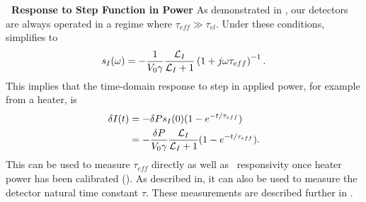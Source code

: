 \textbf{\TES\ Response to Step Function in Power}
As demonstrated in , our detectors are always operated in a regime where $\tau_{eff} \gg \tau_{el}$.
Under these conditions,  simplifies to
\begin{equation} \label{eqn:htr-step-resp-high}
s_I(\omega) = - \frac{1}{V_0 \gamma}\frac{\mathcal{L}_I}{\mathcal{L}_I + 1}
                       \left(1 + j \omega \tau_{eff}\right)^{-1}.
\end{equation}
This implies that the time-domain response to step in applied power, for example from a heater, is
\begin{align} \label{eqn:htr-step-resp-high-time}
    \delta I(t) & = - \delta P s_I(0) (1 - e^{-t/\tau_{eff}}) \\
                & = - \frac{\delta P}{V_0 \gamma}\frac{\mathcal{L}_I}{\mathcal{L}_I + 1}
                      (1 - e^{-t/\tau_{eff}}).
\end{align}
This can be used to measure $\tau_{eff}$ directly as well as \DC\ responsivity once heater power has been calibrated ().
As described in, it can also be used to measure the detector natural time constant $\tau$.
These measurements are described further in .

